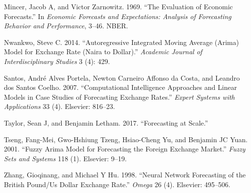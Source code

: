 \documentclass[12pt,a4paper]{article}
\numberwithin{equation}{section}
\numberwithin{figure}{section}
\numberwithin{table}{section}
\renewcommand{\baselinestretch}{1.5}
\begin{document}
\hypertarget{ref-mincer1969}{}
Mincer, Jacob A, and Victor Zarnowitz. 1969. ``The Evaluation of
Economic Forecasts.'' In \emph{Economic Forecasts and Expectations:
Analysis of Forecasting Behavior and Performance}, 3--46. NBER.

\hypertarget{ref-nwankwo2014}{}
Nwankwo, Steve C. 2014. ``Autoregressive Integrated Moving Average
(Arima) Model for Exchange Rate (Naira to Dollar).'' \emph{Academic
Journal of Interdisciplinary Studies} 3 (4): 429.

\hypertarget{ref-santos2007}{}
Santos, André Alves Portela, Newton Carneiro Affonso da Costa, and
Leandro dos Santos Coelho. 2007. ``Computational Intelligence Approaches
and Linear Models in Case Studies of Forecasting Exchange Rates.''
\emph{Expert Systems with Applications} 33 (4). Elsevier: 816--23.

\hypertarget{ref-taylor2017}{}
Taylor, Sean J, and Benjamin Letham. 2017. ``Forecasting at Scale.''

\hypertarget{ref-tseng2001}{}
Tseng, Fang-Mei, Gwo-Hshiung Tzeng, Hsiao-Cheng Yu, and Benjamin JC
Yuan. 2001. ``Fuzzy Arima Model for Forecasting the Foreign Exchange
Market.'' \emph{Fuzzy Sets and Systems} 118 (1). Elsevier: 9--19.

\hypertarget{ref-zhang1998}{}
Zhang, Gioqinang, and Michael Y Hu. 1998. ``Neural Network Forecasting
of the British Pound/Us Dollar Exchange Rate.'' \emph{Omega} 26 (4).
Elsevier: 495--506.

\newpage
\renewcommand{\baselinestretch}{1}
\nocite{*}

\end{document}
